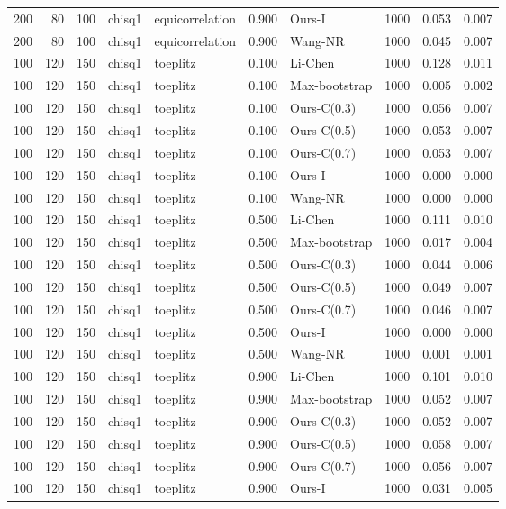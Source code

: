 \begin{tabular}{rrrllrlrrr}
200 & 80 & 100 & chisq1 & equicorrelation & 0.900 & Ours-I & 1000 & 0.053 & 0.007 \\
200 & 80 & 100 & chisq1 & equicorrelation & 0.900 & Wang-NR & 1000 & 0.045 & 0.007 \\
100 & 120 & 150 & chisq1 & toeplitz & 0.100 & Li-Chen & 1000 & 0.128 & 0.011 \\
100 & 120 & 150 & chisq1 & toeplitz & 0.100 & Max-bootstrap & 1000 & 0.005 & 0.002 \\
100 & 120 & 150 & chisq1 & toeplitz & 0.100 & Ours-C(0.3) & 1000 & 0.056 & 0.007 \\
100 & 120 & 150 & chisq1 & toeplitz & 0.100 & Ours-C(0.5) & 1000 & 0.053 & 0.007 \\
100 & 120 & 150 & chisq1 & toeplitz & 0.100 & Ours-C(0.7) & 1000 & 0.053 & 0.007 \\
100 & 120 & 150 & chisq1 & toeplitz & 0.100 & Ours-I & 1000 & 0.000 & 0.000 \\
100 & 120 & 150 & chisq1 & toeplitz & 0.100 & Wang-NR & 1000 & 0.000 & 0.000 \\
100 & 120 & 150 & chisq1 & toeplitz & 0.500 & Li-Chen & 1000 & 0.111 & 0.010 \\
100 & 120 & 150 & chisq1 & toeplitz & 0.500 & Max-bootstrap & 1000 & 0.017 & 0.004 \\
100 & 120 & 150 & chisq1 & toeplitz & 0.500 & Ours-C(0.3) & 1000 & 0.044 & 0.006 \\
100 & 120 & 150 & chisq1 & toeplitz & 0.500 & Ours-C(0.5) & 1000 & 0.049 & 0.007 \\
100 & 120 & 150 & chisq1 & toeplitz & 0.500 & Ours-C(0.7) & 1000 & 0.046 & 0.007 \\
100 & 120 & 150 & chisq1 & toeplitz & 0.500 & Ours-I & 1000 & 0.000 & 0.000 \\
100 & 120 & 150 & chisq1 & toeplitz & 0.500 & Wang-NR & 1000 & 0.001 & 0.001 \\
100 & 120 & 150 & chisq1 & toeplitz & 0.900 & Li-Chen & 1000 & 0.101 & 0.010 \\
100 & 120 & 150 & chisq1 & toeplitz & 0.900 & Max-bootstrap & 1000 & 0.052 & 0.007 \\
100 & 120 & 150 & chisq1 & toeplitz & 0.900 & Ours-C(0.3) & 1000 & 0.052 & 0.007 \\
100 & 120 & 150 & chisq1 & toeplitz & 0.900 & Ours-C(0.5) & 1000 & 0.058 & 0.007 \\
100 & 120 & 150 & chisq1 & toeplitz & 0.900 & Ours-C(0.7) & 1000 & 0.056 & 0.007 \\
100 & 120 & 150 & chisq1 & toeplitz & 0.900 & Ours-I & 1000 & 0.031 & 0.005 \\

\end{tabular}
